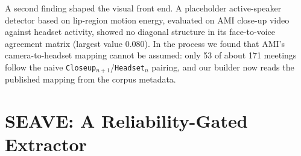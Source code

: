 \documentclass[conference]{IEEEtran}
\begin{document}
A second finding shaped the visual front end. A placeholder active-speaker detector based on lip-region motion energy, evaluated on AMI close-up video against headset activity, showed no diagonal structure in its face-to-voice agreement matrix (largest value 0.080). In the process we found that AMI's camera-to-headset mapping cannot be assumed: only 53 of about 171 meetings follow the naive \texttt{Closeup}$_{n+1}$/\texttt{Headset}$_n$ pairing, and our builder now reads the published mapping from the corpus metadata.

\section{SEAVE: A Reliability-Gated Extractor}
\label{sec:seave}
\end{document}
